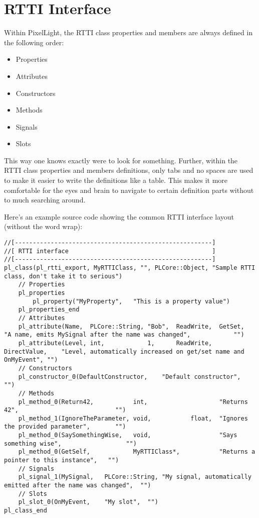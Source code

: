 \section{\ac{RTTI} Interface}
Within PixelLight, the \ac{RTTI} class properties and members are always defined in the following order:
\begin{itemize}
\item Properties
\item Attributes
\item Constructors
\item Methods
\item Signals
\item Slots
\end{itemize}
This way one knows exactly were to look for something. Further, within the \ac{RTTI} class properties and members definitions, only tabs and no spaces are used to make it easier to write the definitions like a table. This makes it more comfortable for the eyes and brain to navigate to certain definition parts without to much searching around.

Here's an example source code showing the common \ac{RTTI} interface layout (without the word wrap):
\begin{lstlisting}[caption=\ac{RTTI} interface (without the word wrap)]
//[-------------------------------------------------------]
//[ RTTI interface                                        ]
//[-------------------------------------------------------]
pl_class(pl_rtti_export, MyRTTIClass, "", PLCore::Object, "Sample RTTI class, don't take it to serious")
	// Properties
	pl_properties
		pl_property("MyProperty",	"This is a property value")
	pl_properties_end
	// Attributes
	pl_attribute(Name,	PLCore::String,	"Bob",	ReadWrite,	GetSet,			"A name, emits MySignal after the name was changed",			"")
	pl_attribute(Level,	int,			1,		ReadWrite,	DirectValue,	"Level, automatically increased on get/set name and OnMyEvent",	"")
	// Constructors
	pl_constructor_0(DefaultConstructor,	"Default constructor",	"")
	// Methods
	pl_method_0(Return42,			int,					"Returns 42",							"")
	pl_method_1(IgnoreTheParameter,	void,			float,	"Ignores the provided parameter",		"")
	pl_method_0(SaySomethingWise,	void,					"Says something wise",					"")
	pl_method_0(GetSelf,			MyRTTIClass*,			"Returns a pointer to this instance",	"")
	// Signals
	pl_signal_1(MySignal,	PLCore::String,	"My signal, automatically emitted after the name was changed",	"")
	// Slots
	pl_slot_0(OnMyEvent,	"My slot",	"")
pl_class_end
\end{lstlisting}



